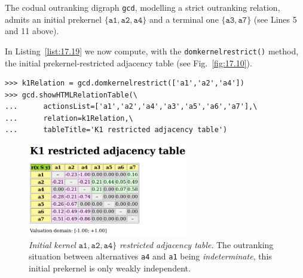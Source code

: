 The codual outranking digraph \texttt{gcd}, modelling a strict outranking relation, admits an initial prekernel $\{\mathtt{a1}, \mathtt{a2}, \mathtt{a4}\}$ and a terminal one $\{\mathtt{a3}, \mathtt{a7}\}$ (see Lines 5 and 11 above).

In Listing~\vref{list:17.19} we now compute, with the \texttt{domkernelrestrict()} method, the initial prekernel-restricted adjacency table (see Fig.~\vref{fig:17.10}).
\begin{lstlisting}[caption={Computing a dominant prekernel restricted adjancecy table},label=list:17.19]
>>> k1Relation = gcd.domkernelrestrict(['a1','a2','a4'])
>>> gcd.showHTMLRelationTable(\
...      actionsList=['a1','a2','a4','a3','a5','a6','a7'],\
...      relation=k1Relation,\
...      tableTitle='K1 restricted adjacency table')
\end{lstlisting}
\begin{figure}[ht]
\sidecaption[t]
\includegraphics[width=7cm]{Figures/17-10-k1restricted.png}
\caption[Initial kernel $\{\mathtt{a1}, \mathtt{a2}, \mathtt{a4}\}$ restricted adjacency table]{\emph{Initial kernel} $\mathtt{a1}, \mathtt{a2}, \mathtt{a4}\}$ \emph{restricted adjacency table}. The outranking situation between alternatives \texttt{a4} and \texttt{a1} being \emph{indeterminate}, this initial prekernel is only weakly independent. }
\label{fig:17.10}       %
\end{figure}

